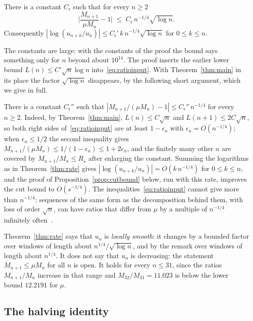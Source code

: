 \begin{theorem}\label{thm:rate}
There is a constant $C_{\mathrm r}$ such that for every $n\ge2$
\[ \Big|\frac{M_{n+1}}{\mu M_n}-1\Big| \;\le\; C_{\mathrm r}\, n^{-1/4}\sqrt{\log n} . \]
Consequently $|\log(u_{n+k}/u_n)|\le C_{\mathrm r}'\,k\,n^{-1/4}\sqrt{\log n}$ for $0\le k\le n$.
\end{theorem}

The constants are large: with the constants of the proof the bound says something only for $n$
beyond about $10^{14}$. The proof inserts the earlier lower bound $L(n)\le C'\sqrt n\log n$
into~\eqref{eq:ratioinput}. With Theorem~\ref{thm:main} in its place the factor $\sqrt{\log n}$
disappears, by the following short argument, which we give in full.

\begin{remark}
There is a constant $C_{\mathrm r}''$ such that $|M_{n+1}/(\mu M_n)-1|\le C_{\mathrm r}''\,n^{-1/4}$ for every
$n\ge2$. Indeed, by Theorem~\ref{thm:main}, $L(n)\le C\sqrt n$ and $L(n+1)\le2C\sqrt n$, so both right
sides of~\eqref{eq:ratioinput} are at least $1-\epsilon_n$ with $\epsilon_n=O(n^{-1/4})$; when
$\epsilon_n\le1/2$ the second inequality gives $M_{n+1}/(\mu M_n)\le1/(1-\epsilon_n)\le1+2\epsilon_n$, and
the finitely many other $n$ are covered by $M_{n+1}/M_n\le R_\star$ after enlarging the constant.
Summing the logarithms as in Theorem~\ref{thm:rate} gives $|\log(u_{n+k}/u_n)|=O(k\,n^{-1/4})$ for
$0\le k\le n$, and the proof of Proposition~\ref{prop:cutbound} below, run with this rate, improves
the cut bound to $O(s^{-1/4})$. The inequalities~\eqref{eq:ratioinput} cannot give more than
$n^{-1/4}$: sequences of the same form as the decomposition behind them, with loss of order $\sqrt n$, can
have ratios that differ from $\mu$ by a multiple of $n^{-1/4}$ infinitely often~\cite{Repo}.
\end{remark}

Theorem~\ref{thm:rate} says that $u_n$ is \emph{locally smooth}: it changes by a bounded factor over
windows of length about $n^{1/4}/\sqrt{\log n}$, and by the remark over windows of length about
$n^{1/4}$. It does not say that $u_n$ is decreasing: the
statement $M_{n+1}\le\mu M_n$ for all $n$ is open. It holds for every $n\le31$, since the ratios
$M_{n+1}/M_n$ increase in that range and $M_{32}/M_{31}=11.023$ is below the lower bound
$12.2191$ for $\mu$.

\subsection{The halving identity}

